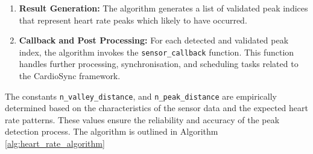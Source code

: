 \begin{enumerate}
    \item \textbf{Result Generation:} The algorithm generates a list of validated peak indices that represent heart rate peaks which likely to have occurred.
    
    \item \textbf{Callback and Post Processing:} For each detected and validated peak index, the algorithm invokes the \texttt{sensor\_callback} function. This function handles further processing, synchronisation, and scheduling tasks related to the CardioSync framework.
\end{enumerate}

\noindent The constants \texttt{n\_valley\_distance}, and \texttt{n\_peak\_distance} are empirically determined based on the characteristics of the sensor data and the expected heart rate patterns. These values ensure the reliability and accuracy of the peak detection process. The algorithm is outlined in Algorithm \ref{alg:heart_rate_algorithm}

